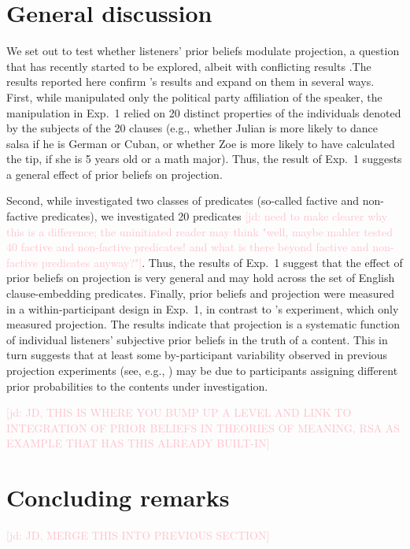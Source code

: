 \documentclass[11pt,fleqn]{article}
\newcommand{\jd}[1]{\textcolor{Pink}{[jd: #1]}}
\newcommand{\6}{\mbox{$[\hspace*{-.6mm}[$}}
\newcommand{\9}{\mbox{$]\hspace*{-.6mm}]$}}
\newcommand{\citepos}[1]{\citeauthor{#1}'s \citeyear{#1}}
\newcommand{\citeposs}[1]{\citeauthor{#1}'s}
\begin{document}
\section{General discussion}
\label{s4}


We set out to test whether listeners' prior beliefs modulate projection, a question that has recently started to be explored, albeit with conflicting results \cite{mahler2020, lorson2018}.The results reported here confirm \citepos{mahler2020} results and expand on them in several ways. First, while  manipulated only the political party affiliation of the speaker, the manipulation in Exp.~1 relied on 20 distinct properties of the individuals denoted by the subjects of the 20 clauses (e.g., whether Julian is more likely to dance salsa if he is German or Cuban, or whether Zoe is more likely to have calculated the tip, if she is 5 years old or a math major). Thus, the result of Exp.~1 suggests a general effect of prior beliefs on projection.

Second, while  investigated two classes of predicates (so-called factive and non-factive predicates), we investigated 20 predicates \jd{need to make clearer why this is a difference; the uninitiated reader may think "well, maybe mahler tested 40 factive and non-factive predicates! and what is there beyond factive and non-factive predicates anyway?"}. Thus, the results of Exp.~1 suggest that the effect of prior beliefs on projection is very general and may hold across the set of English clause-embedding predicates. Finally, prior beliefs and projection were measured in a within-participant design in Exp.~1, in contrast to \citeposs{mahler2020} experiment, which only measured projection. The results indicate that projection is a systematic function of individual listeners' subjective prior beliefs in the truth of a content. This in turn suggests that at least some by-participant variability observed in previous projection experiments (see, e.g., ) may be due to participants assigning different prior probabilities to the contents under investigation. 

\jd{JD, THIS IS WHERE YOU BUMP UP A LEVEL AND LINK TO INTEGRATION OF PRIOR BELIEFS IN THEORIES OF MEANING, RSA AS EXAMPLE THAT HAS THIS ALREADY BUILT-IN}

\section{Concluding remarks}
\jd{JD, MERGE THIS INTO PREVIOUS SECTION}
\end{document}
